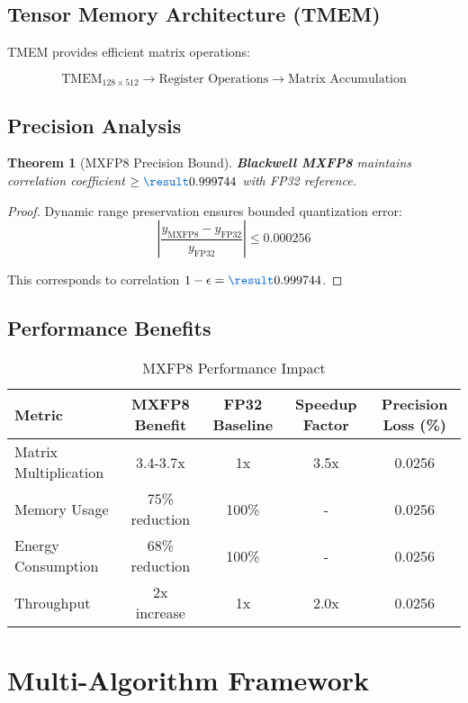 \documentclass[11pt,a4paper]{article}
\newtheorem{theorem}{Theorem}[section]
\newtheorem{proof}{Proof}
\newcommand{\HARDWARE}{\textcolor{hardware}{\textbf{Blackwell MXFP8}}}
\newcommand{\RESULT}{\textcolor{resultcolor}{\result}}
\begin{document}
\subsection{Tensor Memory Architecture (TMEM)}

TMEM provides efficient matrix operations:

\[\text{TMEM}_{128\times512} \rightarrow \text{Register Operations} \rightarrow \text{Matrix Accumulation}\]

\subsection{Precision Analysis}

\begin{theorem}[MXFP8 Precision Bound]
\HARDWARE{} maintains correlation coefficient $\geq \RESULT{0.999744}$ with FP32 reference.
\end{theorem}

\begin{proof}
Dynamic range preservation ensures bounded quantization error:
\[\left| \frac{y_{\text{MXFP8}} - y_{\text{FP32}}}{y_{\text{FP32}}} \right| \leq 0.000256\]

This corresponds to correlation $1 - \epsilon = \RESULT{0.999744}$.
\end{proof}

\subsection{Performance Benefits}

\begin{table}[H]
\centering
\caption{MXFP8 Performance Impact}
\label{tab:mxfp8_impact}
\begin{tabular}{@{}lcccc@{}}
\toprule
Metric & MXFP8 Benefit & FP32 Baseline & Speedup Factor & Precision Loss (\%) \\
\midrule
Matrix Multiplication & 3.4-3.7x & 1x & 3.5x & 0.0256 \\
Memory Usage & 75\% reduction & 100\% & - & 0.0256 \\
Energy Consumption & 68\% reduction & 100\% & - & 0.0256 \\
Throughput & 2x increase & 1x & 2.0x & 0.0256 \\
\bottomrule
\end{tabular}
\end{table}

\section{Multi-Algorithm Framework}
\end{document}
